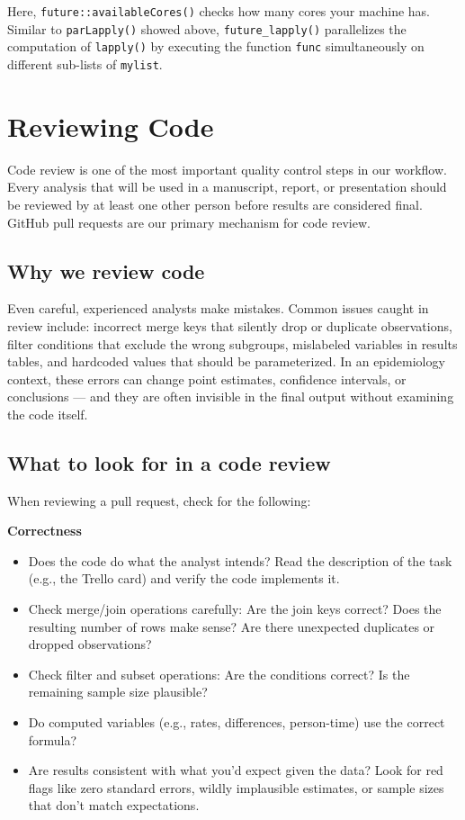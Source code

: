\documentclass[
]{book}
\providecommand{\tightlist}{%
  \setlength{\itemsep}{0pt}\setlength{\parskip}{0pt}}
\begin{document}
Here, \texttt{future::availableCores()} checks how many cores your machine has. Similar to \texttt{parLapply()} showed above, \texttt{future\_lapply()} parallelizes the computation of \texttt{lapply()} by executing the function \texttt{func} simultaneously on different sub-lists of \texttt{mylist}.

\section{Reviewing Code}\label{reviewing-code}

Code review is one of the most important quality control steps in our workflow. Every analysis that will be used in a manuscript, report, or presentation should be reviewed by at least one other person before results are considered final. GitHub pull requests are our primary mechanism for code review.

\subsection{Why we review code}\label{why-we-review-code}

Even careful, experienced analysts make mistakes. Common issues caught in review include: incorrect merge keys that silently drop or duplicate observations, filter conditions that exclude the wrong subgroups, mislabeled variables in results tables, and hardcoded values that should be parameterized. In an epidemiology context, these errors can change point estimates, confidence intervals, or conclusions --- and they are often invisible in the final output without examining the code itself.

\subsection{What to look for in a code review}\label{what-to-look-for-in-a-code-review}

When reviewing a pull request, check for the following:

\textbf{Correctness}

\begin{itemize}
\tightlist
\item
  Does the code do what the analyst intends? Read the description of the task (e.g., the Trello card) and verify the code implements it.
\item
  Check merge/join operations carefully: Are the join keys correct? Does the resulting number of rows make sense? Are there unexpected duplicates or dropped observations?
\item
  Check filter and subset operations: Are the conditions correct? Is the remaining sample size plausible?
\item
  Do computed variables (e.g., rates, differences, person-time) use the correct formula?
\item
  Are results consistent with what you'd expect given the data? Look for red flags like zero standard errors, wildly implausible estimates, or sample sizes that don't match expectations.
\end{itemize}
\end{document}
